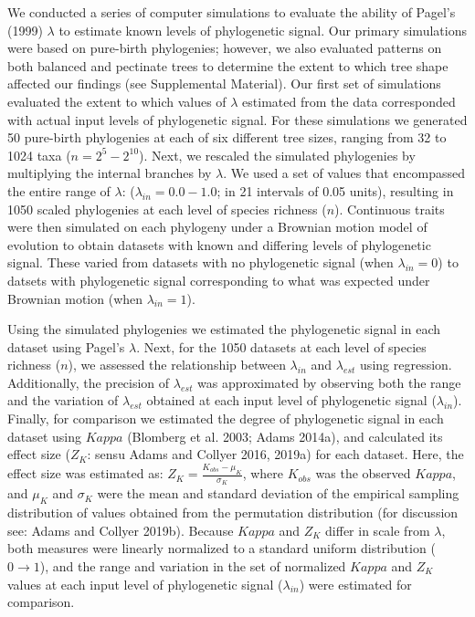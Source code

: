 \documentclass[
]{article}
\begin{document}
We conducted a series of computer simulations to evaluate the ability of
Pagel's (1999) \(\lambda\) to estimate known levels of phylogenetic
signal. Our primary simulations were based on pure-birth phylogenies;
however, we also evaluated patterns on both balanced and pectinate trees
to determine the extent to which tree shape affected our findings (see
Supplemental Material). Our first set of simulations evaluated the
extent to which values of \(\lambda\) estimated from the data
corresponded with actual input levels of phylogenetic signal. For these
simulations we generated 50 pure-birth phylogenies at each of six
different tree sizes, ranging from 32 to 1024 taxa (\(n=2^5 - 2^{10}\)).
Next, we rescaled the simulated phylogenies by multiplying the internal
branches by \(\lambda\). We used a set of values that encompassed the
entire range of \(\lambda\): (\(\lambda_{in} = 0.0 - 1.0\); in 21
intervals of 0.05 units), resulting in 1050 scaled phylogenies at each
level of species richness (\(n\)). Continuous traits were then simulated
on each phylogeny under a Brownian motion model of evolution to obtain
datasets with known and differing levels of phylogenetic signal. These
varied from datasets with no phylogenetic signal (when
\(\lambda_{in} =0\)) to datsets with phylogenetic signal corresponding
to what was expected under Brownian motion (when \(\lambda_{in} =1\)).
\hfill\break

Using the simulated phylogenies we estimated the phylogenetic signal in
each dataset using Pagel's \(\lambda\). Next, for the 1050 datasets at
each level of species richness (\(n\)), we assessed the relationship
between \(\lambda_{in}\) and \(\lambda_{est}\) using regression.
Additionally, the precision of \(\lambda_{est}\) was approximated by
observing both the range and the variation of \(\lambda_{est}\) obtained
at each input level of phylogenetic signal (\(\lambda_{in}\)). Finally,
for comparison we estimated the degree of phylogenetic signal in each
dataset using \(Kappa\) (Blomberg et al. 2003; Adams 2014a), and
calculated its effect size (\(Z_K\): sensu Adams and Collyer 2016,
2019a) for each dataset. Here, the effect size was estimated as:
\(Z_K=\frac{K_{obs}-\mu_K}{\sigma_K}\), where \(K_{obs}\) was the
observed \(Kappa\), and \(\mu_K\) and \(\sigma_K\) were the mean and
standard deviation of the empirical sampling distribution of values
obtained from the permutation distribution (for discussion see: Adams
and Collyer 2019b). Because \(Kappa\) and \(Z_K\) differ in scale from
\(\lambda\), both measures were linearly normalized to a standard
uniform distribution (\(0\rightarrow1\)), and the range and variation in
the set of normalized \(Kappa\) and \(Z_K\) values at each input level
of phylogenetic signal (\(\lambda_{in}\)) were estimated for comparison.
\hfill\break
\end{document}

